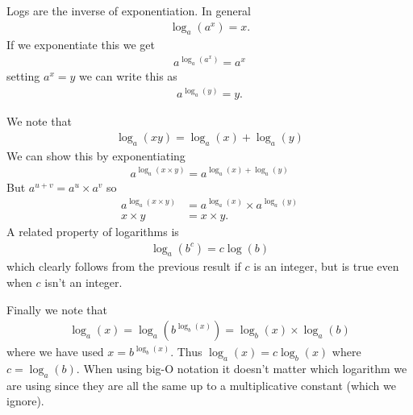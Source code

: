 \documentclass{article}
\begin{document}
Logs are the inverse of exponentiation.  In general
\begin{align*}
  \log_a(a^x) = x.
\end{align*}
If we exponentiate this we get
\begin{align*}
  a^{\log_a(a^x)} = a^x
\end{align*}
setting $a^x=y$ we can write this as
\begin{align*}
  a^{\log_a(y)} = y.
\end{align*}

We note that
\begin{align*}
  \log_a(x y) = \log_a(x) + \log_a(y)
\end{align*}
We can show this by exponentiating
\begin{align*}
  a^{\log_a(x \times y)} = a^{\log_a(x) + \log_a(y)}
\end{align*}
But $a^{u+v} = a^u \times a^v$ so
\begin{align*}
  a^{\log_a(x \times y)} &= a^{\log_a(x)} \times a^{\log_a(y)} \\
  x \times y &= x \times y.
\end{align*}
A related property of logarithms is
\begin{align*}
  \log_a(b^c) = c\log(b)
\end{align*}
which clearly follows from the previous result if $c$ is an integer, but
is true even when $c$ isn't an integer.

Finally we note that
\begin{align*}
  \log_a(x) = \log_a(b^{\log_b(x)}) = \log_b(x) \times \log_a(b)
\end{align*}
where we have used $x = b^{\log_b(x)}$.  Thus $\log_a(x) = c \log_b(x)$
where $c=\log_a(b)$.  When using big-O notation it doesn't matter which
logarithm we are using since they are all the same up to a
multiplicative constant (which we ignore).
\end{document}
